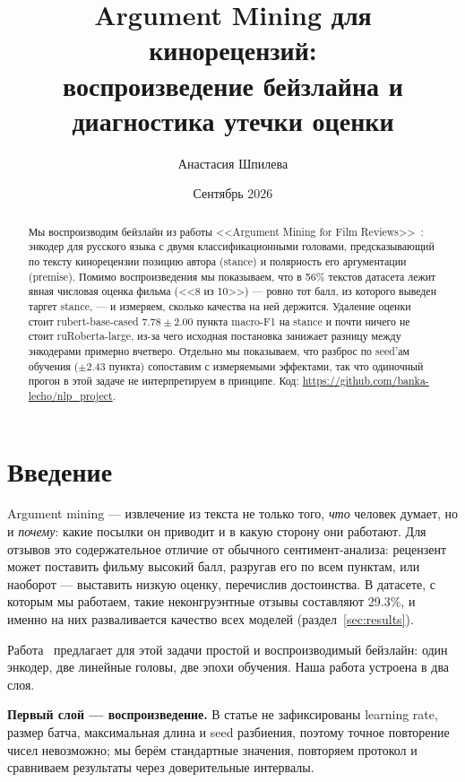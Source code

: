 \documentclass{article}
\title{Argument Mining для кинорецензий:\\воспроизведение бейзлайна и диагностика утечки оценки}
\author{Анастасия Шпилева}
\date{Сентябрь 2026}
\begin{document}
\maketitle

\begin{abstract}
Мы воспроизводим бейзлайн из работы <<Argument Mining for Film Reviews>>~\cite{serbina2026argument}:
энкодер для русского языка с двумя классификационными головами, предсказывающий по тексту
кинорецензии позицию автора (stance) и полярность его аргументации (premise). Помимо
воспроизведения мы показываем, что в 56\% текстов датасета лежит явная числовая оценка фильма
(<<8 из 10>>) --- ровно тот балл, из которого выведен таргет stance, --- и измеряем, сколько
качества на ней держится. Удаление оценки стоит rubert-base-cased $7.78 \pm 2.00$ пункта
macro-F1 на stance и почти ничего не стоит ruRoberta-large, из-за чего исходная постановка
занижает разницу между энкодерами примерно вчетверо. Отдельно мы показываем, что разброс
по seed'ам обучения ($\pm 2.43$ пункта) сопоставим с измеряемыми эффектами, так что
одиночный прогон в этой задаче не интерпретируем в принципе. Код:
\url{https://github.com/banka-lecho/nlp_project}.
\end{abstract}

\section{Введение}

Argument mining --- извлечение из текста не только того, \emph{что} человек думает, но и
\emph{почему}: какие посылки он приводит и в какую сторону они работают. Для отзывов
это содержательное отличие от обычного сентимент-анализа: рецензент может поставить фильму
высокий балл, разругав его по всем пунктам, или наоборот --- выставить низкую оценку,
перечислив достоинства. В датасете, с которым мы работаем, такие неконгруэнтные отзывы
составляют 29.3\%, и именно на них разваливается качество всех моделей (раздел~\ref{sec:results}).

Работа~\cite{serbina2026argument} предлагает для этой задачи простой и воспроизводимый бейзлайн:
один энкодер, две линейные головы, две эпохи обучения. Наша работа устроена в два слоя.

\textbf{Первый слой --- воспроизведение.} В статье не зафиксированы learning rate, размер
батча, максимальная длина и seed разбиения, поэтому точное повторение чисел невозможно;
мы берём стандартные значения, повторяем протокол и сравниваем результаты через
доверительные интервалы.
\end{document}
